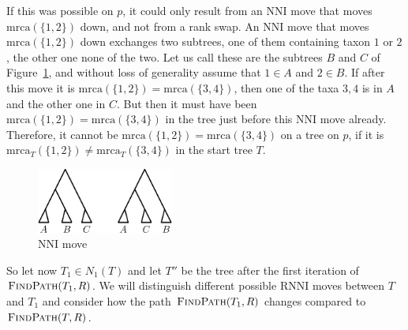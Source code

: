 \documentclass{amsart}
\newcommand{\rnni}{\mathrm{RNNI}}
\newcommand{\findpath}{\textsc{FindPath}}
\newcommand{\mrca}{\mathrm{mrca}}
\newcommand{\nni}{\mathrm{NNI}}
\begin{document}
If this was possible on $p$, it could only result from an $\nni$ move that moves $\mrca(\{1,2\})$ down, and not from a rank swap.
An $\nni$ move that moves $\mrca(\{1,2\})$ down exchanges two subtrees, one of them containing taxon $1$ or $2$, the other one none of the two.
Let us call these are the subtrees $B$ and $C$ of Figure~\ref{fig:nni_move}, and without loss of generality assume that $1 \in A$ and $2 \in B$.
If after this move it is $\mrca(\{1,2\}) = \mrca(\{3,4\})$, then one of the taxa $3,4$ is in $A$ and the other one in $C$.
But then it must have been $\mrca(\{1,2\}) = \mrca(\{3,4\})$ in the tree just before this $\nni$ move already.
Therefore, it cannot be $\mrca(\{1,2\}) = \mrca(\{3,4\})$ on a tree on $p$, if it is $\mrca_T(\{1,2\}) \neq \mrca_T(\{3,4\})$ in the start tree $T$.


\begin{figure}[H]
\centering
\includegraphics[width=0.4\textwidth]{NNI_move}
\vspace{12pt}
\caption{$\nni$ move}
\label{fig:nni_move}
\end{figure}

So let now $T_1 \in N_1(T)$ and let $T''$ be the tree after the first iteration of $\findpath(T_1,R)$. We will distinguish different possible $\rnni$ moves between $T$ and $T_1$ and consider how the path $\findpath(T_1,R)$ changes compared to $\findpath(T,R)$.
\end{document}
